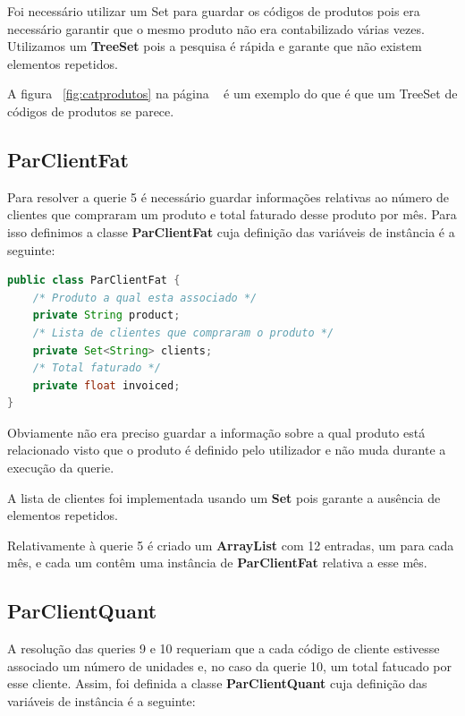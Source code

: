 \documentclass[10pt] {article}
\begin{document}
\par Foi necessário utilizar um Set para guardar os códigos de produtos pois era necessário garantir que o mesmo produto 
não era contabilizado várias vezes. Utilizamos um \textbf{TreeSet} pois a pesquisa é rápida e garante que não existem 
elementos repetidos.
\par A figura ~\ref{fig:catprodutos} na página ~\pageref{fig:catprodutos} é um exemplo do que é que um TreeSet de 
códigos de produtos se parece.

\subsection{ParClientFat}
\par Para resolver a querie 5 é necessário guardar informações relativas ao número de clientes que compraram um produto 
e total faturado desse produto por mês. Para isso definimos a classe \textbf{ParClientFat} cuja definição das variáveis de 
instância é a seguinte: 

\begin{lstlisting}[language=Java]
public class ParClientFat {
	/* Produto a qual esta associado */
	private String product;
	/* Lista de clientes que compraram o produto */
	private Set<String> clients;
	/* Total faturado */
	private float invoiced;
}
\end{lstlisting}

\par Obviamente não era preciso guardar a informação sobre a qual produto está relacionado visto que o produto é definido 
pelo utilizador e não muda durante a execução da querie.
\par A lista de clientes foi implementada usando um \textbf{Set} pois garante a ausência de elementos repetidos.
\par Relativamente à querie 5 é criado um \textbf{ArrayList} com 12 entradas, um para cada mês, e cada um contêm uma 
instância de \textbf{ParClientFat} relativa a esse mês.

\subsection{ParClientQuant}
\par A resolução das queries 9 e 10 requeriam que a cada código de cliente estivesse associado um número de unidades e,
no caso da querie 10, um total fatucado por esse cliente. Assim, foi definida a classe \textbf{ParClientQuant} cuja
definição das variáveis de instância é a seguinte:
\end{document}
